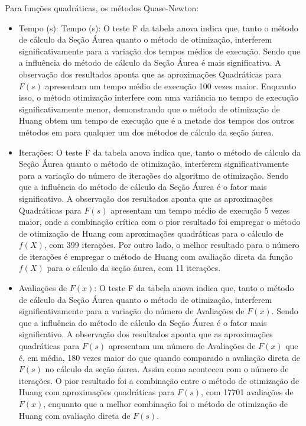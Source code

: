     Para funções quadráticas, os métodos Quase-Newton:
    \begin{itemize}
        \item {Tempo (s):} {Tempo (s):} O teste F da tabela anova indica que, tanto o método de cálculo da Seção Áurea quanto o método de otimização, interferem significativamente para a variação dos tempos médios de execução. Sendo que a influência do método de cálculo da Seção Áurea é mais significativa. A observação dos resultados aponta que as aproximações Quadráticas para $F(s)$ apresentam um tempo médio de execução 100 vezes maior. Enquanto isso, o método otimização interfere com uma variância no tempo de execução significativamente menor, demonstrando que o método de otimização de Huang obtem um tempo de execução que é a metade dos tempos dos outros métodos em para qualquer um dos métodos de cálculo da seção áurea.
        \item {Iterações:}  O teste F da tabela anova indica que, tanto o método de cálculo da Seção Áurea quanto o método de otimização, interferem significativamente para a variação do número de iterações do algoritmo de otimização. Sendo que a influência do método de cálculo da Seção Áurea é o fator mais significativo. A observação dos resultados aponta que as aproximações Quadráticas para $F(s)$ apresentam um tempo médio de execução 5 vezes maior, onde a combinação crítica com o pior resultado foi empregar o método de otimização de Huang com aproximações quadráticas para o cálculo de $f(X)$, com 399 iterações. Por outro lado, o melhor resultado para o número de iterações é empregar o método de Huang com avaliação direta da função $f(X)$ para o cálculo da seção áurea, com 11 iterações.
        \item {Avaliações de $F(x)$:} O teste F da tabela anova indica que, tanto o método de cálculo da Seção Áurea quanto o método de otimização, interferem significativamente para a variação do número de Avaliações de $F(x)$. Sendo que a influência do método de cálculo da Seção Áurea é o fator mais significativo. A observação dos resultados aponta que as aproximações quadráticas para $F(s)$ apresentam um número de Avaliações de $F(x)$ que é, em média, 180 vezes maior do que quando comparado a avaliação direta de $F(s)$ no cálculo da seção áurea. Assim como aconteceu com o número de iterações. O pior resultado foi a combinação entre o método de otimização de Huang com aproximações quadráticas para $F(s)$, com 17701 avaliações de $F(x)$, enquanto que a melhor combinação foi o método de otimização de Huang com avaliação direta de $F(s)$.        

\end{itemize}
